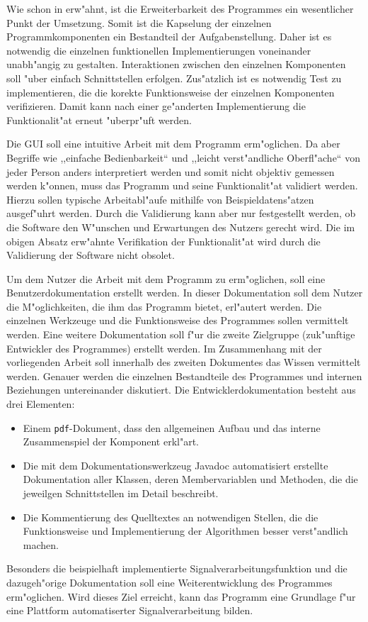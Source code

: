 Wie schon in  erw"ahnt, ist die Erweiterbarkeit des Programmes ein wesentlicher Punkt der Umsetzung.
Somit ist die Kapselung der einzelnen Programmkomponenten ein Bestandteil der Aufgabenstellung.
Daher ist es notwendig die einzelnen funktionellen Implementierungen voneinander unabh"angig zu gestalten.
Interaktionen zwischen den einzelnen Komponenten soll "uber einfach Schnittstellen erfolgen.
Zus"atzlich ist es notwendig Test zu implementieren, die die korekte Funktionsweise der einzelnen Komponenten verifizieren.
Damit kann nach einer ge"anderten Implementierung die Funktionalit"at erneut "uberpr"uft werden.

Die \ac{GUI} soll eine intuitive Arbeit mit dem Programm erm"oglichen.
Da aber Begriffe wie ,,einfache Bedienbarkeit`` und ,,leicht verst"andliche Oberfl"ache`` von jeder Person anders interpretiert werden und somit nicht objektiv gemessen werden k"onnen, muss das Programm und seine Funktionalit"at validiert werden.
Hierzu sollen typische Arbeitabl"aufe mithilfe von Beispieldatens"atzen ausgef"uhrt werden.
Durch die Validierung kann aber nur festgestellt werden, ob die Software den W"unschen und Erwartungen des Nutzers gerecht wird.
Die im obigen Absatz erw"ahnte Verifikation der Funktionalit"at wird durch die Validierung der Software nicht obsolet.

Um dem Nutzer die Arbeit mit dem Programm zu erm"oglichen, soll eine Benutzerdokumentation erstellt werden.
In dieser Dokumentation soll dem Nutzer die M"oglichkeiten, die ihm das Programm bietet, erl"autert werden.
Die einzelnen Werkzeuge und die Funktionsweise des Programmes sollen vermittelt werden.
Eine weitere Dokumentation soll f"ur die zweite Zielgruppe (zuk"unftige Entwickler des Programmes) erstellt werden.
Im Zusammenhang mit der vorliegenden Arbeit soll innerhalb des zweiten Dokumentes das Wissen vermittelt werden.
Genauer werden die einzelnen Bestandteile des Programmes und internen Beziehungen untereinander diskutiert.
Die Entwicklerdokumentation besteht aus drei Elementen:
\begin{itemize}
	\item Einem \verb|pdf|-Dokument, dass den allgemeinen Aufbau und das interne Zusammenspiel der Komponent erkl"art.
	\item Die mit dem Dokumentationswerkzeug Javadoc automatisiert erstellte Dokumentation aller Klassen, deren Membervariablen und Methoden, die die jeweilgen Schnittstellen im Detail beschreibt.
	\item Die Kommentierung des Quelltextes an notwendigen Stellen, die die Funktionsweise und Implementierung der Algorithmen besser verst"andlich machen.
\end{itemize}
Besonders die beispielhaft implementierte Signalverarbeitungsfunktion und die dazugeh"orige Dokumentation soll eine Weiterentwicklung des Programmes erm"oglichen.
Wird dieses Ziel erreicht, kann das Programm eine Grundlage f"ur eine Plattform automatiserter Signalverarbeitung bilden.

